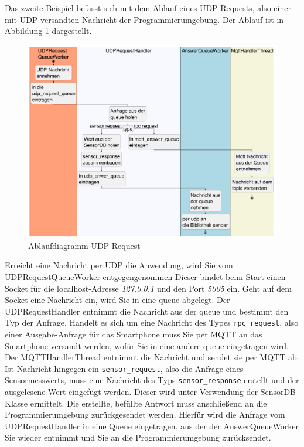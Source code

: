 \documentclass[11pt,a4paper]{report}
\begin{document}
Das zweite Beispiel befasst sich mit dem Ablauf eines UDP-Requests, also einer mit UDP versandten Nachricht der Programmierumgebung.
Der Ablauf ist in Abbildung \ref{fig:serverUDPReqPath} dargestellt.
\begin{figure}[htbp]
  \centering
  \includegraphics[width=\textwidth]{images/UDPRequestServerPath}
  \caption{Ablaufdiagramm UDP Request}
  \label{fig:serverUDPReqPath}
\end{figure}
Erreicht eine Nachricht per UDP die Anwendung, wird Sie vom UDPRequestQueueWorker entgegengenommen
Dieser bindet beim Start einen Socket für die localhost-Adresse \textit{127.0.0.1} und den Port \textit{5005}  ein.
Geht auf dem Socket eine Nachricht ein, wird Sie in eine queue abgelegt.
Der UDPRequestHandler entnimmt die Nachricht aus der queue und bestimmt den Typ der Anfrage.
Handelt es sich um eine Nachricht des Types \texttt{rpc\_request}, also einer Ausgabe-Anfrage für das Smartphone muss Sie per MQTT an das Smartphone versandt werden, wofür Sie in eine andere queue eingetragen wird.
Der MQTTHandlerThread entnimmt die Nachricht und sendet sie per MQTT ab.
Ist Nachricht hingegen ein \texttt{sensor\_request}, also die Anfrage eines Sensormesswerts, muss eine Nachricht des Typs \texttt{sensor\_response} erstellt und der ausgelesene Wert eingefügt werden.
Dieser wird unter Verwendung der SensorDB-Klasse ermittelt.
Die erstellte, befüllte Antwort muss anschließend an die Programmierumgebung zurückgesendet werden.
Hierfür wird die Anfrage vom UDPRequestHandler in eine Queue eingetragen, aus der der AnswerQueueWorker Sie wieder entnimmt und Sie an die Programmierumgebung zurücksendet.
\end{document}
